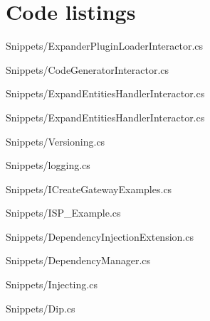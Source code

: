 \chapter{Code listings} \label{appendix_code_listings} 

 
  {Snippets/ExpanderPluginLoaderInteractor.cs}

 
  {Snippets/CodeGeneratorInteractor.cs}

 
  {Snippets/ExpandEntitiesHandlerInteractor.cs}


  {Snippets/ExpandEntitiesHandlerInteractor.cs}

 
  {Snippets/Versioning.cs}

 
  {Snippets/logging.cs}

 
  {Snippets/ICreateGatewayExamples.cs}


  {Snippets/ISP_Example.cs}

  
  {Snippets/DependencyInjectionExtension.cs}

  
    {Snippets/DependencyManager.cs}

    
      {Snippets/Injecting.cs}

      
    {Snippets/Dip.cs}